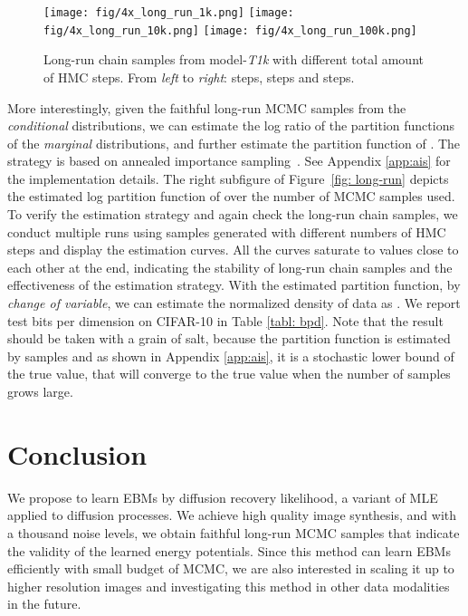 \documentclass{article} \usepackage{iclr2021_conference,times}
\def\Figref#1{Figure~\ref{#1}}
\begin{document}
\begin{wrapfigure}{r}{0.38\linewidth}
\centering
\texttt{[image: fig/4x\_long\_run\_1k.png]}
\texttt{[image: fig/4x\_long\_run\_10k.png]}
\texttt{[image: fig/4x\_long\_run\_100k.png]}
\caption{Long-run chain samples from model-{\em T1k} with different total amount of HMC steps. From {\em left} to {\em right}:  steps,  steps and  steps.}
\vspace{-.3cm}
\label{fig: long-run-samples}
\end{wrapfigure}
More interestingly, given the faithful long-run MCMC samples from the {\em conditional} distributions, we can estimate the log ratio of the partition functions of the {\em marginal} distributions, and further estimate the partition function of . The strategy is based on annealed importance sampling~\citep{neal2001annealed}. See Appendix \ref{app:ais} for the implementation details. The right subfigure of \Figref{fig: long-run} depicts the estimated log partition function of  over the number of MCMC samples used. To verify the estimation strategy and again check the long-run chain samples, we conduct multiple runs using samples generated with different numbers of HMC steps and display the estimation curves. All the curves saturate to values close to each other at the end, indicating the stability of long-run chain samples and the effectiveness of the estimation strategy. With the estimated partition function, by {\em change of variable}, we can estimate the normalized density of data as . We report test bits per dimension on CIFAR-10 in Table \ref{tabl: bpd}. Note that the result should be taken with a grain of salt, because the partition function is estimated by samples and as shown in Appendix \ref{app:ais}, it is a stochastic lower bound of the true value, that will converge to the true value when the number of samples grows large. 

\section{Conclusion} 





We propose to learn EBMs by diffusion recovery likelihood, a variant of MLE applied to diffusion processes. We achieve high quality image synthesis, and with a thousand noise levels, we obtain faithful long-run MCMC samples that indicate the validity of the learned energy potentials. Since this method can learn EBMs efficiently with small budget of MCMC, we are also interested in scaling it up to higher resolution images and investigating this method in other data modalities in the future. 
\end{document}
